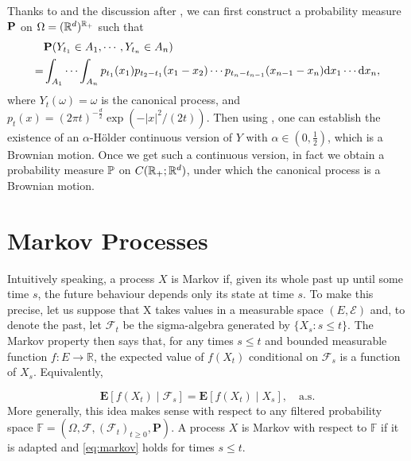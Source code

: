 Thanks to  and the discussion after  , we can first construct a probability measure \({\mathbf P}\) on \(\Omega=({\mathbb R}^d)^{{\mathbb R}_+}\) such that 
\begin{align*}
    &{\mathbf P}(Y_{t_1}\in A_1,\cdots, Y_{t_n}\in A_n)\\
    =&\int_{A_1}\cdots\int_{A_n} p_{t_1}(x_1) p_{t_2-t_1}(x_1-x_2) \cdots p_{t_n-t_{n-1}}(x_{n-1}-x_n) \text{\rm{d}} x_1\cdots \text{\rm{d}} x_n,  
\end{align*}
where \(Y_t(\omega)=\omega\) is the canonical process, and \(p_t(x)=(2\pi t)^{-\frac{d}{2}} \exp (-|x|^2/(2t))\). Then using , one can establish the existence of an \(\alpha\)-Hölder  continuous version of \(Y\) with \(\alpha\in (0,\frac{1}{2})\), which is a Brownian motion. Once we get such a continuous version, in fact we obtain a probability measure \({\mathbb P}\) on \(C({\mathbb R}_+; {\mathbb R}^d)\), under which the canonical process is a Brownian motion.  

\section{Markov Processes}
Intuitively speaking, a process \(X\) is Markov if, given its whole past up until some time \(s\), the future behaviour depends only its state at time \(s\). To make this precise, let us suppose that X takes values in a measurable space \((E,\mathcal{E})\) and, to denote the past, let \(\mathcal{F}_t\) be the sigma-algebra generated by \(\{X_s\colon s\leq t\}\). The Markov property then says that, for any times $s\leq t$ and bounded measurable function $f\colon E\rightarrow{\mathbb R}$, the expected value of $f(X_t)$ conditional on \(\mathcal{F}_s\) is a function of \(X_s\). Equivalently,

\begin{equation}\label{eq:markov}
    {\mathbf E}\left[f(X_t)\mid\mathcal{F}_s\right]={\mathbf E}\left[f(X_t)\mid X_s\right],\quad \mbox{a.s}.
\end{equation}
More generally, this idea makes sense with respect to any filtered probability space \(\mathbb{F}=(\Omega,\mathcal{F},(\mathcal{F}_t)_{t\geq 0},{\mathbf P})\). A process \(X\) is Markov with respect to \(\mathbb{F}\) if it is adapted and \eqref{eq:markov} holds for times \(s\leq t\).

